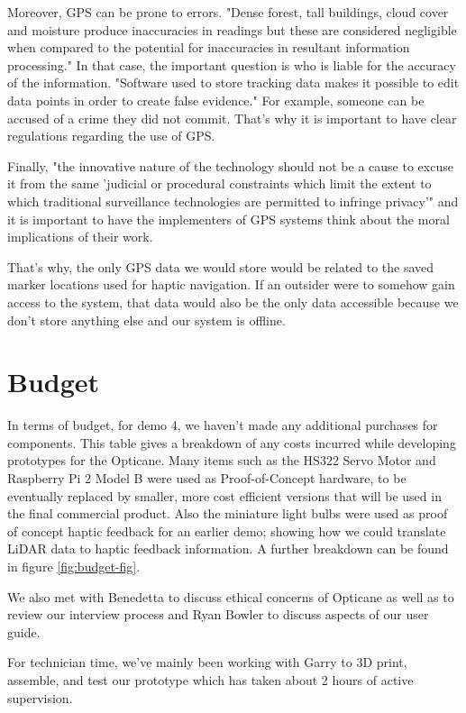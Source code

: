 \documentclass{article}
\begin{document}
Moreover, GPS can be prone to errors. "Dense forest, tall buildings, cloud cover and moisture produce inaccuracies in readings but these are considered negligible when compared to the potential for inaccuracies in resultant information processing." \cite{18michael} In that case, the important question is who is liable for the accuracy of the information. "Software used to store tracking data makes it possible to edit data points in order to create false evidence." \cite{18michael} For example, someone can be accused of a crime they did not commit. That’s why it is important to have clear regulations regarding the use of GPS. 

Finally, "the innovative nature of the technology should not be a cause to excuse it from the same 'judicial or procedural constraints which limit the extent to which traditional surveillance technologies are permitted to infringe privacy'" and it is important to have the implementers of GPS systems think about the moral implications of their work. \cite{18michael}

That’s why, the only GPS data we would store would be related to the saved marker locations used for haptic navigation. If an outsider were to somehow gain access to the system, that data would also be the only data accessible because we don't store anything else and our system is offline.

\section{Budget}

In terms of budget, for demo 4, we haven't made any additional purchases for components. This table gives a breakdown of any costs incurred while developing prototypes for the Opticane. Many items such as the HS322 Servo Motor and Raspberry Pi 2 Model B were used as Proof-of-Concept hardware, to be eventually replaced by smaller, more cost efficient versions that will be used in the final commercial product. Also the miniature light bulbs were used as proof of concept haptic feedback for an earlier demo; showing how we could translate LiDAR data to haptic feedback information. A further breakdown can be found in figure \ref{fig:budget-fig}.

We also met with Benedetta to discuss ethical concerns of Opticane as well as to review our interview process and Ryan Bowler to discuss aspects of our user guide.

For technician time, we've mainly been working with Garry to 3D print, assemble, and test our prototype which has taken about 2 hours of active supervision.
\end{document}
